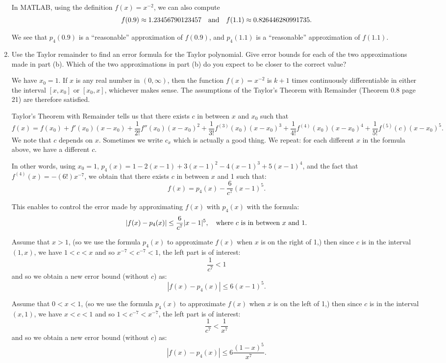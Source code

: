 \documentclass[pdftex,11pt]{article}
\begin{document}
\begin{enumerate}
In MATLAB, using the definition $f(x)=x^{-2}$, we can also compute
$$f(0.9) \approx 1.23456790123457 \quad \textmd{and} \quad f(1.1) \approx 0.826446280991735.$$

We see that $p_4(0.9)$ is a ``reasonable'' approximation of $f(0.9)$, and
$p_4(1.1)$ is a ``reasonable'' approximation of $f(1.1)$.

\color{red}\item
Use the Taylor remainder to find an error formula for the Taylor polynomial.
Give error bounds for each of the two approximations made in part (b). Which of
the two approximations in part (b) do you expect to be closer to the correct
value?\\
\color{black}

We have $x_0=1$. If $x$ is any real number in $(0,\infty)$, then the function 
$f(x)=x^{-2}$ is $k+1$ times continuously differentiable in either the interval 
$[x,x_0]$ or $[x_0,x]$, whichever makes sense. The assumptions of the
Taylor's Theorem with Remainder (Theorem 0.8 page 21) are therefore satisfied.

Taylor's Theorem with Remainder tells us that there exists $c$ in between $x$ and $x_0$ such that
$$f(x) = 
f(x_0) 
+ f'(x_0) (x-x_0)
+ \frac{1}{2!} f''(x_0) (x-x_0)^2
+ \frac{1}{3!} f^{(3)}(x_0) (x-x_0)^3
+ \frac{1}{4!} f^{(4)}(x_0) (x-x_0)^4
+ \frac{1}{5!} f^{(5)}(c) (x-x_0)^5.
$$
We note that $c$ depends on $x$. Sometimes we write $c_x$ which is actually a good thing.
We repeat: for each different $x$ in the formula above, we have a different $c$.

In other words, using $x_0=1$, $p_4(x)= 1 - 2 (x-1) + 3 (x-1)^2 - 4 (x-1)^3 + 5 (x-1)^4$, 
and the fact that $f^{(4)}(x) = - (6!)x^{-7}$, we obtain that
there exists $c$ in between $x$ and 1 such that:
$$ f(x) = p_4(x) - \frac{6}{c^7} (x-1)^5.$$

This enables to control the error made by approximating $f(x)$ with $p_4(x)$ with the formula:
$$ | f(x) -  p_4(x) | \leq  \frac{6}{c^7} |x-1|^5,
\quad \textmd{where }c\textmd{ is in between }x\textmd{ and 1}.$$

Assume that $x>1$, (so we use the formula $p_4(x)$ to approximate $f(x)$ when $x$ is on the right of 1,) then
since $c$ is in the interval $(1,x)$, 
we have $1<c<x$  and so $x^{-7}<c^{-7}<1$, the left part is of interest:
$$\frac{1}{c^7} < 1 $$
and so we obtain a new error bound (without $c$) as:
$$ | f(x) -  p_4(x) | \leq  6 (x-1)^5.$$

Assume that $0<x<1$, (so we use the formula $p_4(x)$ to approximate $f(x)$ when $x$ is on the left of 1,) then
since $c$ is in the interval $(x,1)$, 
we have $x<c<1$  and so $1<c^{-7}<x^{-7}$,  the left part is of interest:
$$\frac{1}{c^7} < \frac{1}{x^7} $$
and so we obtain a new error bound (without $c$) as:
$$ | f(x) -  p_4(x) | \leq  6 \frac{(1-x)^5}{x^7}.$$


\end{enumerate}
\end{document}
